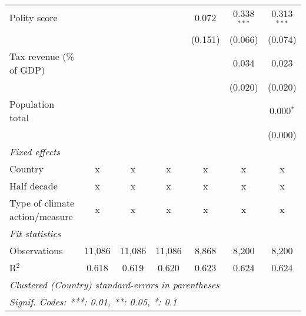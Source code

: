 \begin{tabular}{lcccccc}
   Polity score                                                  &         &               &                & 0.072          & 0.338$^{***}$  & 0.313$^{***}$\\   
                                                                 &         &               &                & (0.151)        & (0.066)        & (0.074)\\   
   Tax revenue (\% of GDP)                                       &         &               &                &                & 0.034          & 0.023\\   
                                                                 &         &               &                &                & (0.020)        & (0.020)\\   
   Population total                                              &         &               &                &                &                & 0.000$^{*}$\\   
                                                                 &         &               &                &                &                & (0.000)\\   
   \emph{Fixed effects}\\
   Country                                                       & x       & x             & x              & x              & x              & x\\  
   Half decade                                                   & x       & x             & x              & x              & x              & x\\  
   Type of climate action/measure                                & x       & x             & x              & x              & x              & x\\  
   \midrule \emph{Fit statistics}\\
   Observations                                                  & 11,086  & 11,086        & 11,086         & 8,868          & 8,200          & 8,200\\  
   R$^2$                                                         & 0.618   & 0.619         & 0.620          & 0.623          & 0.624          & 0.624\\  
   \midrule
   \multicolumn{7}{l}{\emph{Clustered (Country) standard-errors in parentheses}}\\
   \multicolumn{7}{l}{\emph{Signif. Codes: ***: 0.01, **: 0.05, *: 0.1}}\\
\end{tabular}
\par\endgroup


